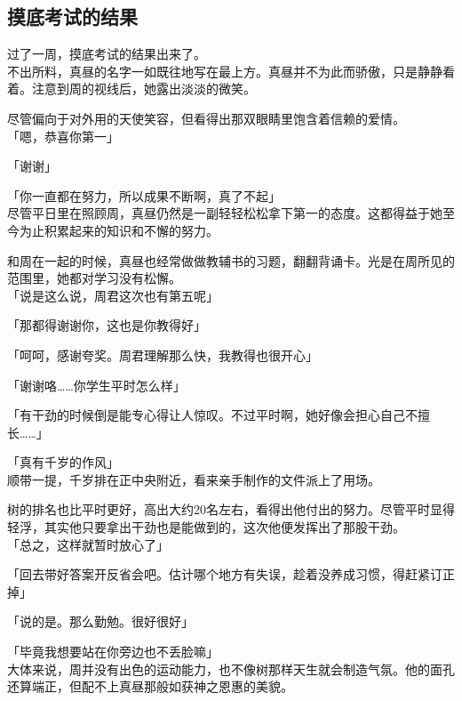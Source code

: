 \subsection{摸底考试的结果}

过了一周，摸底考试的结果出来了。\\

不出所料，真昼的名字一如既往地写在最上方。真昼并不为此而骄傲，只是静静看着。注意到周的视线后，她露出淡淡的微笑。

尽管偏向于对外用的天使笑容，但看得出那双眼睛里饱含着信赖的爱情。\\

「嗯，恭喜你第一」

「谢谢」

「你一直都在努力，所以成果不断啊，真了不起」\\

尽管平日里在照顾周，真昼仍然是一副轻轻松松拿下第一的态度。这都得益于她至今为止积累起来的知识和不懈的努力。

和周在一起的时候，真昼也经常做做教辅书的习题，翻翻背诵卡。光是在周所见的范围里，她都对学习没有松懈。\\

「说是这么说，周君这次也有第五呢」

「那都得谢谢你，这也是你教得好」

「呵呵，感谢夸奖。周君理解那么快，我教得也很开心」

「谢谢咯……你学生平时怎么样」

「有干劲的时候倒是能专心得让人惊叹。不过平时啊，她好像会担心自己不擅长……」

「真有千岁的作风」\\

顺带一提，千岁排在正中央附近，看来亲手制作的文件派上了用场。

树的排名也比平时更好，高出大约20名左右，看得出他付出的努力。尽管平时显得轻浮，其实他只要拿出干劲也是能做到的，这次他便发挥出了那股干劲。\\

「总之，这样就暂时放心了」

「回去带好答案开反省会吧。估计哪个地方有失误，趁着没养成习惯，得赶紧订正掉」

「说的是。那么勤勉。很好很好」

「毕竟我想要站在你旁边也不丢脸嘛」\\

大体来说，周并没有出色的运动能力，也不像树那样天生就会制造气氛。他的面孔还算端正，但配不上真昼那般如获神之恩惠的美貌。\\

